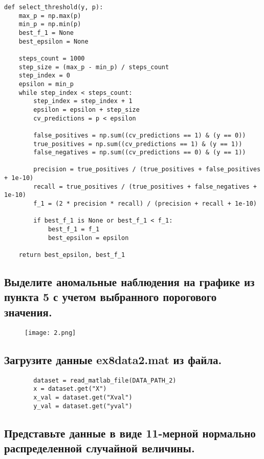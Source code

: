 \begin{lstlisting}
def select_threshold(y, p):
    max_p = np.max(p)
    min_p = np.min(p)
    best_f_1 = None
    best_epsilon = None

    steps_count = 1000
    step_size = (max_p - min_p) / steps_count
    step_index = 0
    epsilon = min_p
    while step_index < steps_count:
        step_index = step_index + 1
        epsilon = epsilon + step_size
        cv_predictions = p < epsilon

        false_positives = np.sum((cv_predictions == 1) & (y == 0))
        true_positives = np.sum((cv_predictions == 1) & (y == 1))
        false_negatives = np.sum((cv_predictions == 0) & (y == 1))

        precision = true_positives / (true_positives + false_positives + 1e-10)
        recall = true_positives / (true_positives + false_negatives + 1e-10)
        f_1 = (2 * precision * recall) / (precision + recall + 1e-10)

        if best_f_1 is None or best_f_1 < f_1:
            best_f_1 = f_1
            best_epsilon = epsilon

    return best_epsilon, best_f_1
\end{lstlisting}

\subsection{Выделите аномальные наблюдения на графике из пункта 5 с учетом выбранного порогового значения.}

\begin{figure}[h]
\centering
    \texttt{[image: 2.png]}
  \label{sec:purpose:payings}
\end{figure}

\subsection{Загрузите данные ex8data2.mat из файла.}

\begin{lstlisting}
        dataset = read_matlab_file(DATA_PATH_2)
        x = dataset.get("X")
        x_val = dataset.get("Xval")
        y_val = dataset.get("yval")
\end{lstlisting}

\subsection{Представьте данные в виде 11-мерной нормально распределенной случайной величины.}

